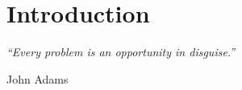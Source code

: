 \chapter{Introduction}

\hfill{\textit{``Every problem is an opportunity in disguise.''}}

\hfill{John Adams}



